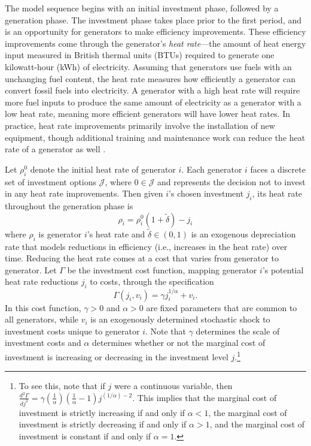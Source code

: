 The model sequence begins with an initial investment phase, followed by a generation phase. The investment phase takes place prior to the first period, and is an opportunity for generators to make efficiency improvements. These efficiency improvements come through the generator's \emph{heat rate}---the amount of heat energy input measured in British thermal units (BTUs) required to generate one kilowatt-hour (kWh) of electricity. Assuming that generators use fuels with an unchanging fuel content, the heat rate measures how efficiently a generator can convert fossil fuels into electricity. A generator with a high heat rate will require more fuel inputs to produce the same amount of electricity as a generator with a low heat rate, meaning more efficient generators will have lower heat rates. In practice, heat rate improvements primarily involve the installation of new equipment, though additional training and maintenance work can reduce the heat rate of a generator as well \citep{eia_heatrate}. 

Let $\rho_i^0$ denote the initial heat rate of generator $i$. Each generator $i$ faces a discrete set of investment options $\mathcal{J}$, where $0 \in \mathcal{J}$ and represents the decision not to invest in any heat rate improvements. Then given $i$'s chosen investment $j_i$, its heat rate throughout the generation phase is
\begin{equation}
    \rho_i = \rho_i^0 (1 + \tilde{\delta}) - j_i
\end{equation}
where $\rho_i$ is generator $i$'s heat rate and $\tilde{\delta} \in (0, 1)$ is an exogenous depreciation rate that models reductions in efficiency (i.e., increases in the heat rate) over time. Reducing the heat rate comes at a cost that varies from generator to generator. Let $\Gamma$ be the investment cost function, mapping generator $i$'s potential heat rate reductions $j_i$ to costs, through the specification 
\begin{equation}
    \Gamma (j_i, v_i) = \gamma j_i^{1/\alpha} + v_i.
\end{equation}
In this cost function, $\gamma > 0$ and $\alpha > 0$ are fixed parameters that are common to all generators, while $v_i$ is an exogenously determined stochastic shock to investment costs unique to generator $i$. Note that $\gamma$ determines the scale of investment costs and $\alpha$ determines whether or not the marginal cost of investment is increasing or decreasing in the investment level $j$.\footnote{To see this, note that if $j$ were a continuous variable, then $\frac{d^2\Gamma}{dj^2} = \gamma \left(\frac{1}{\alpha}\right) \left( \frac{1}{\alpha} -1\right) j^{(1/\alpha) - 2}$. This implies that the marginal cost of investment is strictly increasing if and only if $\alpha < 1$, the marginal cost of investment is strictly decreasing if and only if $\alpha > 1$, and the marginal cost of investment is constant if and only if $\alpha = 1$.} 

